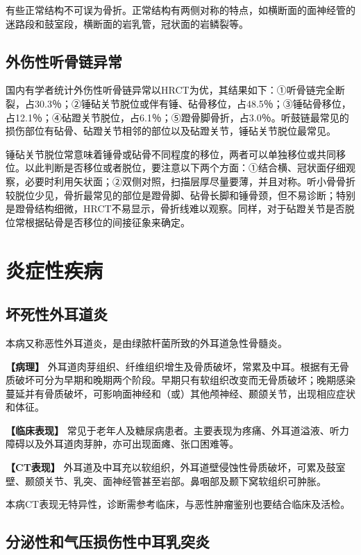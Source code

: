 有些正常结构不可误为骨折。正常结构有两侧对称的特点，如横断面的面神经管的迷路段和鼓室段，横断面的岩乳管，冠状面的岩鳞裂等。

\subsection{外伤性听骨链异常}

国内有学者统计外伤性听骨链异常以HRCT为优，其结果如下：①听骨链完全断裂，占30.3％；②锤砧关节脱位或伴有锤、砧骨移位，占48.5％；③锤砧骨移位，占12.1％；④砧蹬关节脱位，占6.1％；⑤蹬骨脚骨折，占3.0％。听鼓链最常见的损伤部位有砧骨、砧蹬关节相邻的部位以及砧蹬关节，锤砧关节脱位最常见。

锤砧关节脱位常意味着锤骨或砧骨不同程度的移位，两者可以单独移位或共同移位。以此判断是否移位或者脱位，要注意以下两个方面：①结合横、冠状面仔细观察，必要时利用矢状面；②双侧对照，扫描层厚尽量要薄，并且对称。听小骨骨折较脱位少见，骨折最常见的部位是蹬骨脚、砧骨长脚和锤骨颈，但不易诊断；特别是蹬骨结构细微，HRCT不易显示，骨折线难以观察。同样，对于砧蹬关节是否脱位常根据砧骨是否移位的间接征象来确定。

\section{炎症性疾病}

\subsection{坏死性外耳道炎}

本病又称恶性外耳道炎，是由绿脓杆菌所致的外耳道急性骨髓炎。

\textbf{【病理】}
外耳道肉芽组织、纤维组织增生及骨质破坏，常累及中耳。根据有无骨质破坏可分为早期和晚期两个阶段。早期只有软组织改变而无骨质破坏；晚期感染蔓延并有骨质破坏，可影响面神经和（或）其他颅神经、颞颌关节，出现相应症状和体征。

\textbf{【临床表现】}
常见于老年人及糖尿病患者。主要表现为疼痛、外耳道溢液、听力障碍以及外耳道肉芽肿，亦可出现面瘫、张口困难等。

\textbf{【CT表现】}
外耳道及中耳充以软组织，外耳道壁侵蚀性骨质破坏，可累及鼓室壁、颞颌关节、乳突、面神经管甚至岩部。鼻咽部及颞下窝软组织可肿胀。

本病CT表现无特异性，诊断需参考临床，与恶性肿瘤鉴别也要结合临床及活检。

\subsection{分泌性和气压损伤性中耳乳突炎}

